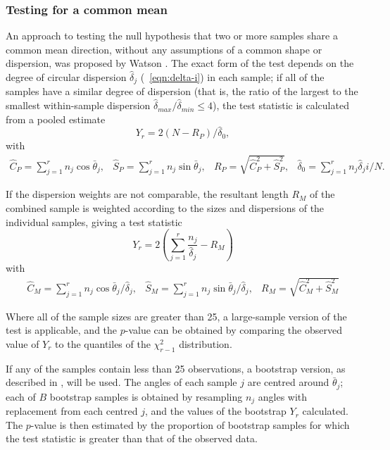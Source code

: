 \documentclass[../../ArchStats.tex]{subfiles}
\begin{document}
\subsubsection{Testing for a common mean}
\label{sec:common-mean-test}

An approach to testing the null hypothesis that two or more samples share a common mean direction, without any assumptions of a common shape or dispersion, was proposed by Watson \cite{Watson1983}. The exact form of the test depends on the degree of circular dispersion $\hat{\delta}_j$ (~\ref{eqn:delta-i}) in each sample; if all of the samples have a similar degree of dispersion (that is, the ratio of the largest to the smallest within-sample dispersion $\hat{\delta}_{max} / \hat{\delta}_{min} \leq 4$), the test statistic is calculated from a pooled estimate
\begin{equation}
Y_r = 2(N - R_P) / \hat{\delta}_0,
\end{equation}
with
\begin{equation}
\begin{matrix*}
\hat{C}_P = \sum_{j=1}^r n_j \cos \bar{\theta}_j, &
\hat{S}_P = \sum_{j=1}^r n_j \sin \bar{\theta}_j, &
R_P = \sqrt{\hat{C}_P^2 + \hat{S}_P^2}, &
\hat{\delta}_0 = \sum_{j=1}^r n_j \hat{\delta}_ji / N.
\end{matrix*}
\end{equation}


If the dispersion weights are not comparable, the resultant length $R_M$ of the combined sample is weighted according to the sizes and dispersions of the individual samples, giving a test statistic
\begin{equation}
Y_r = 2\left(\sum_{j=1}^r \frac{n_j}{\hat{\delta}_j} - R_M\right)
\end{equation}
with 
\begin{equation}
\begin{matrix*}
\hat{C}_M = \sum_{j=1}^r n_j \cos \bar{\theta}_j / \hat{\delta}_j, &
\hat{S}_M = \sum_{j=1}^r n_j \sin \bar{\theta}_j / \hat{\delta}_j, &
R_M = \sqrt{\hat{C}_M^2 + \hat{S}_M^2}
\end{matrix*}
\end{equation}

Where all of the sample sizes are greater than 25, a large-sample version of the test is applicable, and the $p$-value can be obtained by comparing the observed value of  $Y_r$ to the quantiles of the $\chi^2_{r-1}$ distribution. 

If any of the samples contain less than 25 observations, a bootstrap version, as described in \cite[section 8.4.4]{Fisher1993}, will be used. The angles of each sample $j$ are centred around $\bar{\theta}_j$; each of $B$ bootstrap samples is obtained by resampling $n_j$ angles with replacement from each centred $j$, and the values of the bootstrap $Y_r$ calculated. The $p$-value is then estimated by the proportion of bootstrap samples for which the test statistic is greater than that of the observed data.
\end{document}
